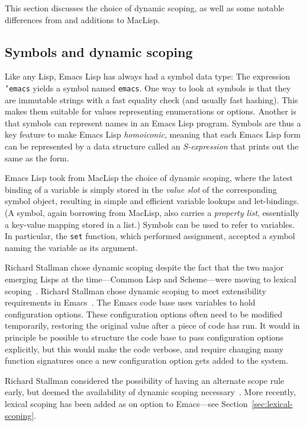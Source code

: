 \documentclass[format=acmsmall, review]{acmart}
\newcommand \Elisp {Emacs Lisp}
\begin{document}
This section discusses the choice of dynamic scoping, as well as
some notable differences from and additions to
MacLisp.

\subsection{Symbols and dynamic scoping}
\label{sec:symbols}

Like any Lisp, \Elisp{} has always had a symbol data type: The expression
\texttt{'emacs} yields a symbol named \texttt{emacs}.  One way to look
at symbols is that they are immutable strings with a fast equality
check (and usually fast hashing).  This makes them suitable for values
representing enumerations or options.  Another is that symbols can
represent names in an \Elisp{} program.  Symbols are thus a key
feature to make \Elisp{} \textit{homoiconic}, meaning that each
\Elisp{} form can be represented by a data structure called an
\textit{S-expression} that prints out the same as the form.

\Elisp{} took from MacLisp the choice of dynamic scoping, where the
latest binding of a variable is simply stored in the \emph{value slot}
of the corresponding symbol object, resulting in simple and efficient
variable lookups and let-bindings.  (A symbol, again borrowing from
MacLisp, also carries a \textit{property list}, essentially a key-value
mapping stored in a list.)  Symbols can be used to refer to
variables.  In particular, the \texttt{set} function, which performed
assignment, accepted a symbol naming the variable as its argument. 

Richard
Stallman chose dynamic scoping despite the fact that the two major emerging
Lisps at the time---Common Lisp and Scheme---were moving to lexical
scoping~\cite{CLtL1,R2RS}.
Richard Stallman chose dynamic scoping to meet extensibility
requirements in Emacs~\cite{Stallman1981}.  The Emacs code base uses
variables to hold configuration options.  These configuration
options often need to be modified temporarily, restoring the original
value after a piece of code has run.  It would in principle be
possible to structure the code base to pass configuration options
explicitly, but this would make the code verbose, and require changing
many function signatures once a new configuration option gets added to
the system.

Richard Stallman considered the possibility of having an alternate
scope rule early, but deemed the availability of dynamic scoping
necessary~\cite{Stallman1981}.  More recently, lexical scoping has
been added as on option to Emacs---see
Section~\ref{sec:lexical-scoping}.
\end{document}

